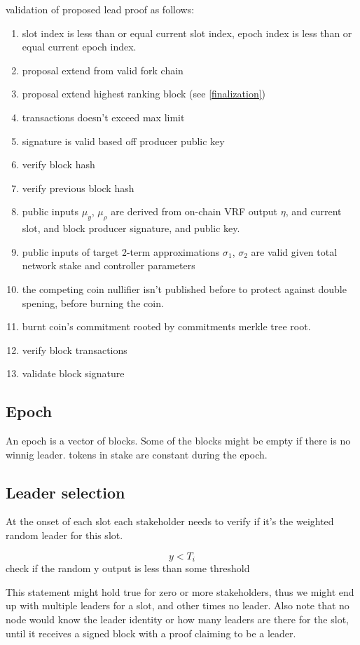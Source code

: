 \documentclass[a4paper]{article}
\begin{document}
validation of proposed lead proof as follows:
\begin{enumerate}
\item slot index is less than or equal current slot index, epoch index is less than or equal current epoch index.
\item proposal extend from valid fork chain
\item proposal extend highest ranking block (see \ref{finalization})
\item transactions doesn't exceed max limit
\item signature is valid based off producer public key
\item verify block hash
\item verify previous block hash
\item public inputs $\mu_y$, $\mu_{\rho}$ are derived from on-chain VRF output $\eta$, and current slot, and block producer signature, and public key.
\item public inputs of target 2-term approximations $\sigma_1$, $\sigma_2$ are valid given total network stake and controller parameters
\item the competing coin nullifier isn't published before to protect against double spening, before burning the coin.
\item burnt coin's commitment rooted by commitments merkle tree root.
\item verify block transactions
\item validate block signature

\end{enumerate}

\subsection{ Epoch}

An epoch is a vector of blocks. Some of the  blocks might be empty if there is no winnig leader. tokens in stake are constant during the epoch.

\subsection{ Leader selection}

At the onset of each slot each stakeholder needs to verify if it's
the weighted random leader for this slot.

$$y < T_{i}$$ check if the random y output is less than some
threshold

This statement might hold true for zero or more stakeholders, thus
we might end up with multiple leaders for a slot, and other times no
leader. Also note that no node would know the leader identity or how many
leaders are there for the slot, until it receives a signed block with
a proof claiming to be a leader.
\end{document}

